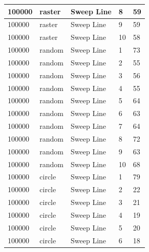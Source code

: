 \documentclass[12pt]{article}
\begin{document}
\begin{longtable}{|l|l|l|l|l|}
100000       & raster            & Sweep Line & 8          & 59                            \\ \hline
100000       & raster            & Sweep Line & 9          & 59                            \\ \hline
100000       & raster            & Sweep Line & 10         & 58                            \\ \hline
100000       & random            & Sweep Line & 1          & 73                            \\ \hline
100000       & random            & Sweep Line & 2          & 55                            \\ \hline
100000       & random            & Sweep Line & 3          & 56                            \\ \hline
100000       & random            & Sweep Line & 4          & 55                            \\ \hline
100000       & random            & Sweep Line & 5          & 64                            \\ \hline
100000       & random            & Sweep Line & 6          & 63                            \\ \hline
100000       & random            & Sweep Line & 7          & 64                            \\ \hline
100000       & random            & Sweep Line & 8          & 72                            \\ \hline
100000       & random            & Sweep Line & 9          & 63                            \\ \hline
100000       & random            & Sweep Line & 10         & 68                            \\ \hline
100000       & circle            & Sweep Line & 1          & 79                            \\ \hline
100000       & circle            & Sweep Line & 2          & 22                            \\ \hline
100000       & circle            & Sweep Line & 3          & 21                            \\ \hline
100000       & circle            & Sweep Line & 4          & 19                            \\ \hline
100000       & circle            & Sweep Line & 5          & 20                            \\ \hline
100000       & circle            & Sweep Line & 6          & 18                            \\ \hline

\end{longtable}
\end{document}
